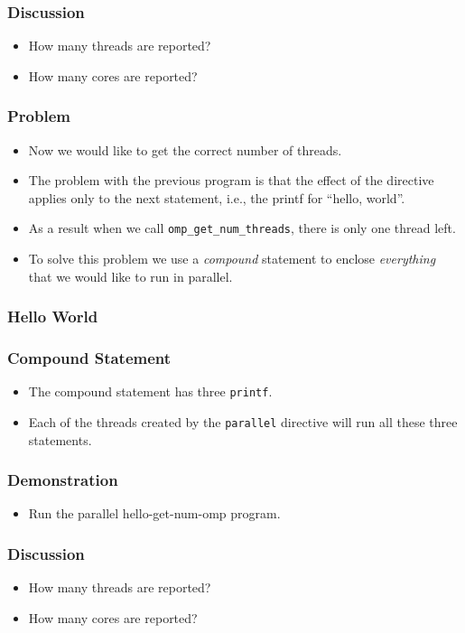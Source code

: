 \documentclass{beamer}
\begin{document}
\begin{frame}
\frametitle{Discussion}
\begin{itemize}
\item How many threads are reported?
\item How many cores are reported?
\end{itemize}
\end{frame}

\begin{frame}
\frametitle{Problem}
\begin{itemize}
\item Now we would like to get the correct number of threads.
\item The problem with the previous program is that the effect of the
  directive applies only to the next statement, i.e., the printf for
  ``hello, world''.
\item As a result when we call {\tt omp\_get\_num\_threads}, there is
  only one thread left.
\item To solve this problem we use a {\em compound} statement to
  enclose {\em everything} that we would like to run in parallel.
\end{itemize}
\end{frame}


\begin{frame}
\frametitle{Hello World}
\end{frame}

\begin{frame}
\frametitle{Compound Statement}
\begin{itemize}
\item The compound statement has three {\tt printf}.
\item Each of the threads created by the {\tt parallel} directive will
  run all these three statements.
\end{itemize}
\end{frame}

\begin{frame}
\frametitle{Demonstration}
\begin{itemize}
\item Run the parallel hello-get-num-omp program.
\end{itemize}
\end{frame}

\begin{frame}
\frametitle{Discussion}
\begin{itemize}
\item How many threads are reported?
\item How many cores are reported?
\end{itemize}
\end{frame}
\end{document}
